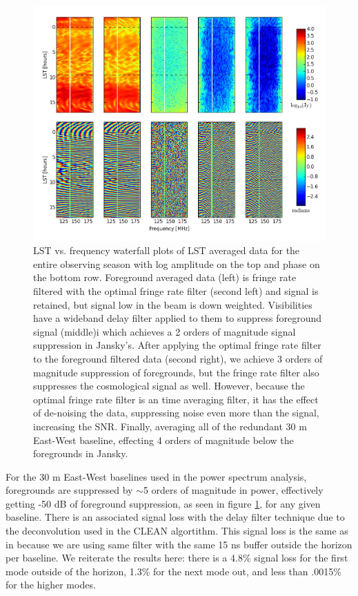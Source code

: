 \documentclass[twocolumn,numberedappendix]{emulateapj} \shorttitle{PSA64}
\begin{document}
\begin{figure}[!t]
\centering
\includegraphics[width=2.3\columnwidth]{plots/waterfalls.png}
\caption{LST vs. frequency waterfall plots of LST averaged data for the entire
observing season with log amplitude on the top and phase on the bottom row.
Foreground averaged data (left) is fringe rate filtered with the optimal fringe
rate filter (second left) and signal is retained, but signal low in the beam is
down weighted. Visibilities have a wideband delay filter applied to them to
suppress foreground signal (middle)i which achieves a 2 orders of magnitude
signal suppression in Jansky's. After applying the optimal fringe rate filter to
the foreground filtered data (second right), we achieve 3 orders of magnitude
suppression of foregrounds, but the fringe rate filter also suppresses the
cosmological signal as well. However, because the optimal fringe rate filter is
an time averaging filter, it has the effect of de-noising the data, suppressing
noise even more than the signal, increasing the SNR. Finally, averaging all of
the redundant 30 m East-West baseline, effecting 4 orders of magnitude below the
foregrounds in Jansky.} 
\label{fig:waterfalls}
\end{figure}

For the 30 m East-West baselines used in the power spectrum analysis,
foregrounds are suppressed by $\sim$5 orders of magnitude in power, effectively
getting -50 dB of foreground suppression, as seen in figure
\ref{fig:waterfalls}, for any given baseline. There is an associated signal loss
with the delay filter technique due to the deconvolution used in the CLEAN
algortithm. This signal loss is the same as in \cite{parsons_et_al2014} because
we are using same filter with the same 15 ns buffer outside the horizon per
baseline. We reiterate the results here: there is a 4.8\% signal loss for the
first mode outside of the horizon, 1.3\% for the next mode out, and less than
.0015\% for the higher modes.
\end{document}
